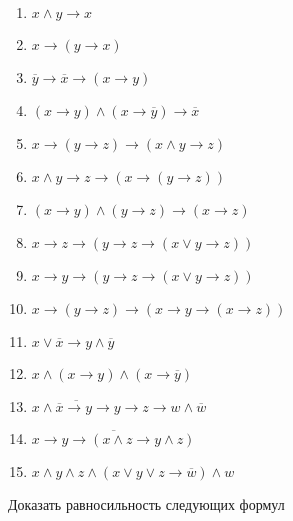 \begin{enumerate}
        \item $x \wedge y \rightarrow x$
        \item $x \rightarrow (y \rightarrow x)$
        \item $\overline y \rightarrow \overline x \rightarrow (x \rightarrow y)$
        \item $(x \rightarrow y) \wedge (x \rightarrow \overline y) \rightarrow \overline x$
        \item $x \rightarrow (y \rightarrow z) \rightarrow  (x \wedge y \rightarrow z)$
        \item $x \wedge y \rightarrow z \rightarrow (x \rightarrow (y \rightarrow z))$
        \item $(x \rightarrow y) \wedge (y \rightarrow z) \rightarrow (x \rightarrow z)$
        \item $x \rightarrow z \rightarrow (y \rightarrow z \rightarrow (x \vee y \rightarrow z))$
        \item $x \rightarrow y \rightarrow (y \rightarrow z \rightarrow (x \vee y \rightarrow z))$
        \item $x \rightarrow (y \rightarrow z) \rightarrow (x \rightarrow y \rightarrow (x \rightarrow z))$
        \item $x \vee \overline x \rightarrow y \wedge \overline y$
        \item $x \wedge (x \rightarrow y) \wedge (x \rightarrow \overline y)$
        \item $\overline{x \wedge \overline x \rightarrow y \rightarrow y} \rightarrow z \rightarrow w \wedge \overline w$
        \item $\overline{x \rightarrow y \rightarrow (x \wedge z \rightarrow y \wedge z)}$
        \item $x \wedge y \wedge z \wedge (x \vee y \vee z \rightarrow \overline w) \wedge w$
    \end{enumerate}

    \begin{center}
        Доказать равносильность следующих формул
    \end{center}

